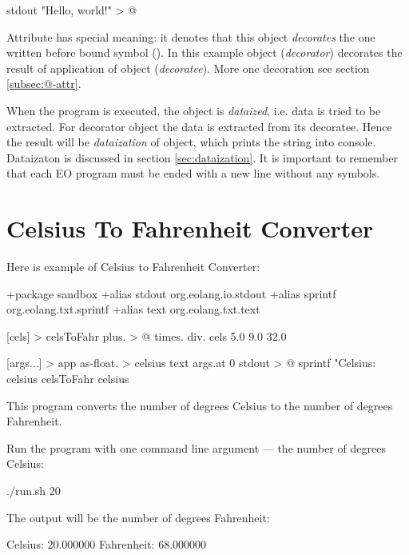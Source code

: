 \documentclass[12pt]{book}
\begin{document}
\begin{ffcode}
stdout "Hello, world!\n" > @
\end{ffcode}
Attribute  has special meaning: it denotes that this object \textit{decorates} the one written before bound symbol (\ff{>}). In this example object  (\textit{decorator}) decorates the result of application of object  (\textit{decoratee}). More one decoration see section \ref{subsec:@-attr}.

When the program is executed, the  object is \textit{dataized}, i.e. data is tried to be extracted. For decorator object the data is extracted from its decoratee. Hence the result will be \textit{dataization} of  object, which prints the string into console. Dataizaton is discussed in section \ref{sec:dataization}. It is important to remember that each EO program must be ended with a new line without any symbols.

\section{Celsius To Fahrenheit Converter}

Here is example of Celsius to Fahrenheit Converter:

\begin{ffcode}
+package sandbox
+alias stdout org.eolang.io.stdout
+alias sprintf org.eolang.txt.sprintf
+alias text org.eolang.txt.text

[cels] > celsToFahr
  plus. > @
    times.
      div.
        cels
        5.0
      9.0
    32.0

[args...] > app
  as-float. > celsius
    text
      args.at 0
  stdout > @
    sprintf
      "Celsius: %
      celsius
      celsToFahr celsius
\end{ffcode}

This program converts the number of degrees Celsius to the number of degrees Fahrenheit. 

Run the program with one command line argument —  the number of degrees Celsius:
\begin{ffcode}
./run.sh 20
\end{ffcode}
The output will be the number of degrees Fahrenheit:
\begin{ffcode}
Celsius: 20.000000
Fahrenheit: 68.000000
\end{ffcode}
\end{document}
